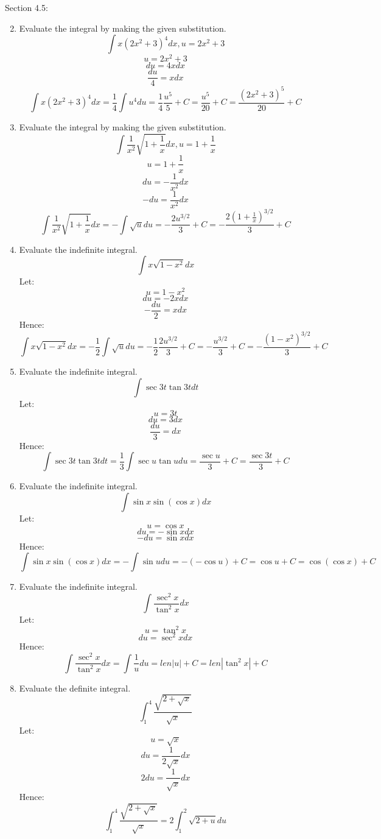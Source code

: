 \documentclass[12pt]{article}
\begin{document}
\newpage 
Section 4.5:

\begin{enumerate}
\setcounter{enumi}{1}
    \item Evaluate the integral by making the given substitution.
    \[\int x(2x^2 + 3)^4 dx, u = 2x^2 + 3\]
    \[u = 2x^2 + 3\]
    \[du = 4xdx\]
    \[\frac{du}{4} = xdx\]
    \[\int x(2x^2 + 3)^4 dx = \frac{1}{4} \int u^4 du = \frac{1}{4} \frac{u^5}{5} + C = \frac{u^5}{20} + C = \frac{(2x^2+3)^5}{20} + C\]
\setcounter{enumi}{5}
    \item Evaluate the integral by making the given substitution.
    \[\int \frac{1}{x^2} \sqrt{1 + \frac{1}{x}} dx, u = 1 + \frac{1}{x}\]
    \[u = 1 + \frac{1}{x}\]
    \[du = -\frac{1}{x^2}dx\]
    \[-du = \frac{1}{x^2}dx\]
    \[\int \frac{1}{x^2} \sqrt{1 + \frac{1}{x}} dx = - \int \sqrt{u} du = - \frac{2u^{3/2}}{3} + C = - \frac{2(1 + \frac{1}{x})^{3/2}}{3} + C \]
\setcounter{enumi}{8}
    \item Evaluate the indefinite integral.
    \[\int x \sqrt{1-x^2}dx\]
    Let:
    \[u = 1 - x^2\]
    \[du =- 2xdx\]
    \[-\frac{du}{2} = xdx\]
    Hence:
    \[\int x \sqrt{1-x^2}dx = -\frac{1}{2}\int \sqrt{u}du = -\frac{1}{2} \frac{2u^{3/2}}{3} + C = -\frac{u^{3/2}}{3} + C = -\frac{(1-x^2)^{3/2}}{3} + C\]
\setcounter{enumi}{14}
    \item Evaluate the indefinite integral.
    \[\int \sec 3t \tan 3t dt\]
    Let:
    \[u = 3t\]
    \[du = 3dx\]
    \[\frac{du}{3} = dx\]
    Hence:
    \[\int \sec 3t \tan 3t dt = \frac{1}{3} \int \sec u \tan u du = \frac{\sec u}{3} + C = \frac{\sec 3t}{3} + C \]
\setcounter{enumi}{19}
    \item Evaluate the indefinite integral.
    \[\int \sin x \sin (\cos x) dx\]
    Let:
    \[u = \cos x\]
    \[du = - \sin x dx\]
    \[-du = \sin x dx\]
    Hence:
    \[\int \sin x \sin (\cos x) dx = - \int \sin u du = - (-\cos u) + C = \cos u + C = \cos (\cos x) + C\]
\setcounter{enumi}{23}
    \item Evaluate the indefinite integral.
    \[\int \frac{\sec^2 x}{\tan^2 x}dx\]
    Let:
    \[u = \tan^2 x\]
    \[du = \sec^2x dx\]
    Hence: 
    \[\int \frac{\sec^2 x}{\tan^2 x}dx = \int \frac{1}{u} du = len{|u|} + C = len{|\tan^2 x|} + C\]
\setcounter{enumi}{41}
    \item Evaluate the definite integral.
    \[\int_{1}^{4} \frac{\sqrt{2+\sqrt{x}}}{\sqrt{x}}\]
    Let:
    \[u = \sqrt{x}\]
    \[du = \frac{1}{2\sqrt{x}}dx\]
    \[2du = \frac{1}{\sqrt{x}}dx\]
    Hence:
    \[\int_{1}^{4} \frac{\sqrt{2+\sqrt{x}}}{\sqrt{x}} = 2\int_{1}^{2} \sqrt{2 + u}du\]

\end{enumerate}
\end{document}
